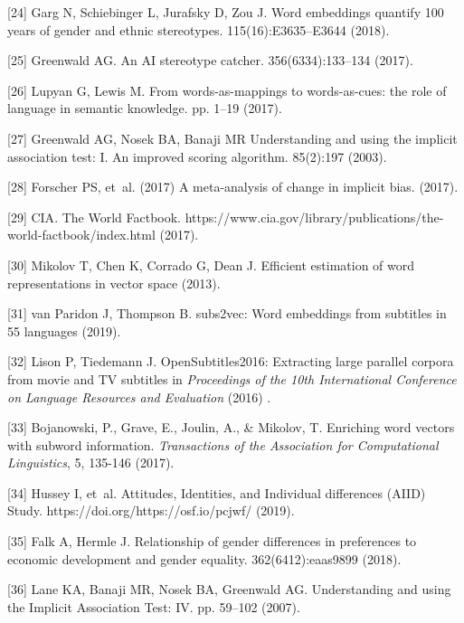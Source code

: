 \documentclass[11pt]{wlscirep}
\begin{document}
[24] Garg N, Schiebinger L, Jurafsky D, Zou J. Word embeddings quantify 100
  years of gender and ethnic stereotypes.
  115(16):E3635--E3644 (2018).

[25] Greenwald AG. An {AI} stereotype catcher.
 356(6334):133--134  (2017).

[26] Lupyan G, Lewis M. From words-as-mappings to words-as-cues: the role of
  language in semantic knowledge.
 pp. 1--19 (2017).

[27] Greenwald AG, Nosek BA, Banaji MR  Understanding and using the implicit
  association test: I. {A}n improved scoring algorithm.
 85(2):197 (2003).

[28] Forscher PS, et~al. (2017) A meta-analysis of change in implicit bias.
 (2017).

[29] {CIA}. The {W}orld {F}actbook.
\newblock
  https://www.cia.gov/library/publications/the-world-factbook/index.html (2017).

[30] Mikolov T, Chen K, Corrado G, Dean J. Efficient estimation of word
  representations in vector space  (2013).

[31] van Paridon J, Thompson B. subs2vec: Word embeddings from subtitles in 55
  languages (2019).

[32] Lison P, Tiedemann J. {OpenSubtitles201}6: Extracting large parallel
  corpora from movie and {TV} subtitles in {\em Proceedings of the 10th
  {I}nternational {C}onference on {L}anguage {R}esources and {E}valuation} (2016) .

[33] Bojanowski, P., Grave, E., Joulin, A., \& Mikolov, T.  Enriching word vectors with subword information. {\em Transactions of the Association for Computational Linguistics}, 5, 135-146 (2017).

[34] Hussey I, et~al.  {A}ttitudes, {I}dentities, and {I}ndividual differences
  ({AIID}) {S}tudy.
\newblock https://doi.org/https://osf.io/pcjwf/ (2019).

[35] Falk A, Hermle J. Relationship of gender differences in preferences to
  economic development and gender equality.
 362(6412):eaas9899 (2018).

[36] Lane KA, Banaji MR, Nosek BA, Greenwald AG. Understanding and using the
  {I}mplicit {A}ssociation {T}est: {IV}.
 pp. 59--102 (2007).
\end{document}
